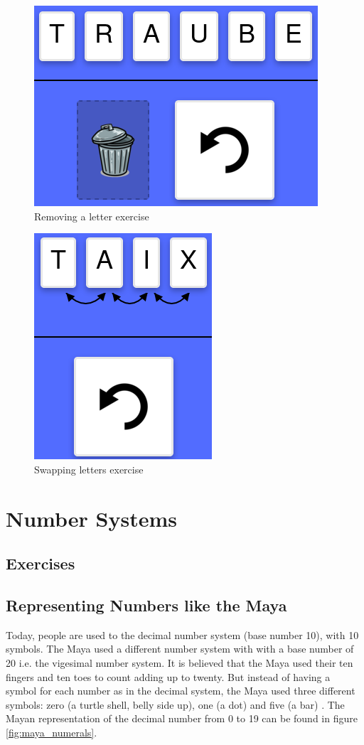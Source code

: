 \begin{figure} 
  \centering
  \includegraphics[width=0.3 \columnwidth]{figures/words_remove.png}
  \caption{Removing a letter exercise} 
  \label{fig:removingLetter} 
\end{figure}

\begin{figure} 
  \centering
  \includegraphics[width=0.2 \columnwidth]{figures/words_swap.png}
  \caption{Swapping letters exercise} 
  \label{fig:swappingLetters} 
\end{figure}

\section{Number Systems}
\label{section:numberSystems}

\subsection{Exercises}
\subsection*{Representing Numbers like the Maya}

Today, people are used to the decimal number system (base number 10), with 10 symbols. The Maya used a different number system with with a base number of 20 i.e. the vigesimal number system. It is believed that the Maya used their ten fingers and ten toes to count adding up to twenty. But instead of having a symbol for each number as in the decimal system, the Maya used three different symbols: zero (a turtle shell, belly side up), one (a dot) and five (a bar) \cite{Maya}. The Mayan representation of the decimal number from 0 to 19 can be found in figure \ref{fig:maya_numerals}.

